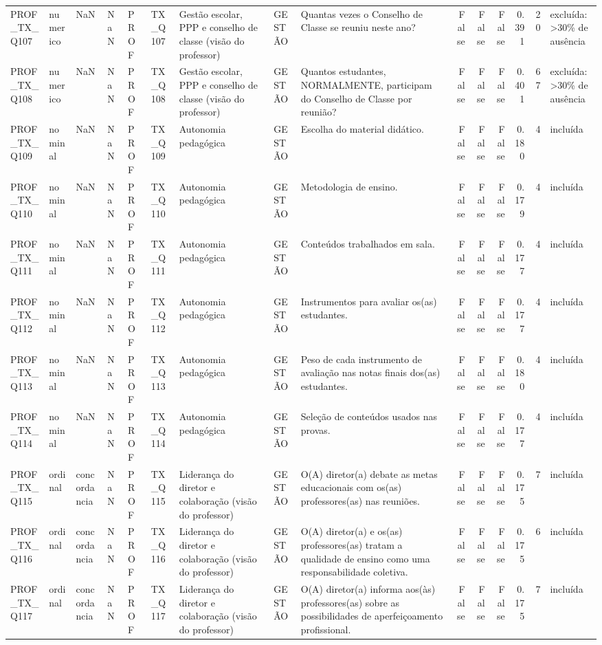 \begin{tabular}{lllllllllrrrrrl}
PROF\_TX\_Q107 & numerico & NaN & NaN & PROF & TX\_Q107 & Gestão escolar, PPP e conselho de classe (visão do professor) & GESTÃO & Quantas vezes o Conselho de Classe se reuniu neste ano? & False & False & False & 0.391 & 20 & excluída: >30\% de ausência \\
PROF\_TX\_Q108 & numerico & NaN & NaN & PROF & TX\_Q108 & Gestão escolar, PPP e conselho de classe (visão do professor) & GESTÃO & Quantos estudantes, NORMALMENTE, participam do Conselho de Classe por reunião? & False & False & False & 0.401 & 67 & excluída: >30\% de ausência \\
PROF\_TX\_Q109 & nominal & NaN & NaN & PROF & TX\_Q109 & Autonomia pedagógica & GESTÃO & Escolha do material didático. & False & False & False & 0.180 & 4 & incluída \\
PROF\_TX\_Q110 & nominal & NaN & NaN & PROF & TX\_Q110 & Autonomia pedagógica & GESTÃO & Metodologia de ensino. & False & False & False & 0.179 & 4 & incluída \\
PROF\_TX\_Q111 & nominal & NaN & NaN & PROF & TX\_Q111 & Autonomia pedagógica & GESTÃO & Conteúdos trabalhados em sala. & False & False & False & 0.177 & 4 & incluída \\
PROF\_TX\_Q112 & nominal & NaN & NaN & PROF & TX\_Q112 & Autonomia pedagógica & GESTÃO & Instrumentos para avaliar os(as) estudantes. & False & False & False & 0.177 & 4 & incluída \\
PROF\_TX\_Q113 & nominal & NaN & NaN & PROF & TX\_Q113 & Autonomia pedagógica & GESTÃO & Peso de cada instrumento de avaliação nas notas finais dos(as) estudantes. & False & False & False & 0.180 & 4 & incluída \\
PROF\_TX\_Q114 & nominal & NaN & NaN & PROF & TX\_Q114 & Autonomia pedagógica & GESTÃO & Seleção de conteúdos usados nas provas. & False & False & False & 0.177 & 4 & incluída \\
PROF\_TX\_Q115 & ordinal & concordancia & NaN & PROF & TX\_Q115 & Liderança do diretor e colaboração (visão do professor) & GESTÃO & O(A) diretor(a) debate as metas educacionais com os(as) professores(as) nas reuniões. & False & False & False & 0.175 & 7 & incluída \\
PROF\_TX\_Q116 & ordinal & concordancia & NaN & PROF & TX\_Q116 & Liderança do diretor e colaboração (visão do professor) & GESTÃO & O(A) diretor(a) e os(as) professores(as) tratam a qualidade de ensino como uma responsabilidade coletiva. & False & False & False & 0.175 & 6 & incluída \\
PROF\_TX\_Q117 & ordinal & concordancia & NaN & PROF & TX\_Q117 & Liderança do diretor e colaboração (visão do professor) & GESTÃO & O(A) diretor(a) informa aos(às) professores(as) sobre as possibilidades de aperfeiçoamento profissional. & False & False & False & 0.175 & 7 & incluída \\

\end{tabular}
